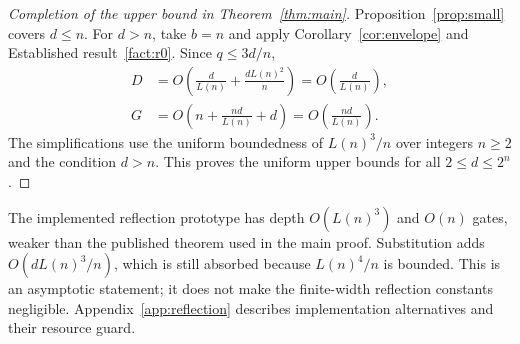 \begin{proof}[Completion of the upper bound in Theorem~\ref{thm:main}]
Proposition~\ref{prop:small} covers $d\le n$. For $d>n$, take $b=n$ and apply Corollary~\ref{cor:envelope} and Established result~\ref{fact:r0}. Since $q\le3d/n$,
\begin{align}
D&=O\left(\frac d{L(n)}+\frac{dL(n)^2}{n}\right)
 =O\left(\frac d{L(n)}\right),\\
G&=O\left(n+\frac{nd}{L(n)}+d\right)
 =O\left(\frac{nd}{L(n)}\right).
\end{align}
The simplifications use the uniform boundedness of $L(n)^3/n$ over integers $n\ge2$ and the condition $d>n$. This proves the uniform upper bounds for all $2\le d\le2^n$.
\end{proof}

The implemented reflection prototype has depth $O(L(n)^3)$ and $O(n)$ gates, weaker than the published theorem used in the main proof. Substitution adds $O(dL(n)^3/n)$, which is still absorbed because $L(n)^4/n$ is bounded. This is an asymptotic statement; it does not make the finite-width reflection constants negligible. Appendix~\ref{app:reflection} describes implementation alternatives and their resource guard.
